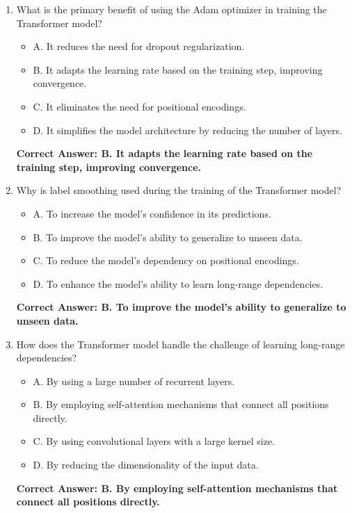 \begin{figure*}
\begin{tcolorbox}[width=\textwidth,fontupper=\footnotesize,title=Repeated Baseline Questions - Continued]
\begin{enumerate}
    \item What is the primary benefit of using the Adam optimizer in training the Transformer model?
    \begin{itemize}
        \item A. It reduces the need for dropout regularization.
        \item B. It adapts the learning rate based on the training step, improving convergence.
        \item C. It eliminates the need for positional encodings.
        \item D. It simplifies the model architecture by reducing the number of layers.
    \end{itemize}
    \textbf{Correct Answer: B. It adapts the learning rate based on the training step, improving convergence.}

    \item Why is label smoothing used during the training of the Transformer model?
    \begin{itemize}
        \item A. To increase the model's confidence in its predictions.
        \item B. To improve the model's ability to generalize to unseen data.
        \item C. To reduce the model's dependency on positional encodings.
        \item D. To enhance the model's ability to learn long-range dependencies.
    \end{itemize}
    \textbf{Correct Answer: B. To improve the model's ability to generalize to unseen data.}

    \item How does the Transformer model handle the challenge of learning long-range dependencies?
    \begin{itemize}
        \item A. By using a large number of recurrent layers.
        \item B. By employing self-attention mechanisms that connect all positions directly.
        \item C. By using convolutional layers with a large kernel size.
        \item D. By reducing the dimensionality of the input data.
    \end{itemize}
    \textbf{Correct Answer: B. By employing self-attention mechanisms that connect all positions directly.}


\end{enumerate}
\end{tcolorbox}
\end{figure*}
